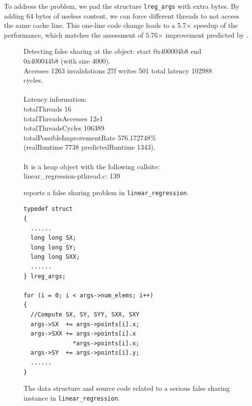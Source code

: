 To address the problem, we pad the structure {\tt lreg\_args} with extra bytes. By adding 64 bytes of useless content, we can force different threads to not access the same cache line. This one-line code change leads to a 5.7$\times$ speedup of the performance, which matches the assessment of 5.76$\times$ improvement predicted by \cheetah{}.

\begin{figure}
\begin{minipage}{\columnwidth}

\centering

\fbox
{
\begin{minipage}{3in}
Detecting false sharing at the object: start 0x400004b8 end 0x400044b8 (with size 4000). \\
Accesses 1263 invalidations 27f writes 501 total latency 102988 cycles.\\
\\
Latency information: \\
totalThreads 16 \\
totalThreadsAccesses 12e1 \\
totalThreadsCycles 106389 \\
totalPossibleImprovementRate 576.172748\% \\
(realRuntime 7738 predictedRuntime 1343).\\
\\
It is a heap object with the following callsite:\\
linear\_regression-pthread.c: 139
\end{minipage}
}
\vspace{1em}
\caption{\cheetah{} reports a false sharing problem in \texttt{linear\_regression}.}
\label{fig:lr}
\end{minipage}
\end{figure}


\begin{figure}
\begin{verbatim}
typedef struct
{
  ......  
  long long SX;
  long long SY;
  long long SXX;
  ......
} lreg_args;	

for (i = 0; i < args->num_elems; i++)
{
  //Compute SX, SY, SYY, SXX, SXY
  args->SX  += args->points[i].x;
  args->SXX += args->points[i].x
              *args->points[i].x;
  args->SY  += args->points[i].y;
  ......
}
\end{verbatim}
\caption{The data structure and source code related to a serious false sharing instance in \texttt{linear\_regression}.}
\label{lr:code}
\end{figure}

